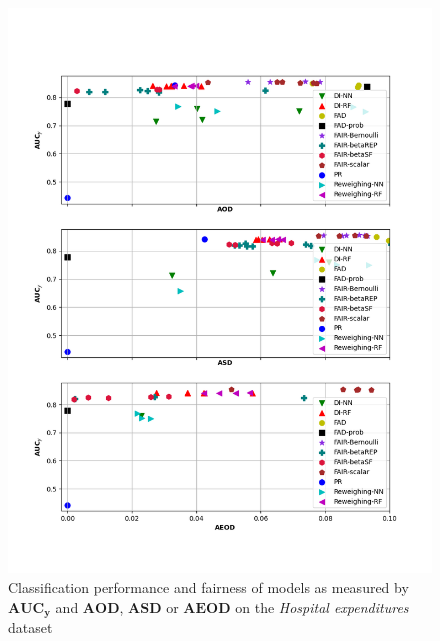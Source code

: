 \documentclass[preprint,12pt]{elsarticle}
\begin{document}
\begin{figure}
	\center
	\includegraphics[angle=0, width=1\textwidth]{MEPS19_all.png}
	\captionsetup{justification=centering}
	\caption{Classification performance and fairness of models as measured by $\mathbf{AUC_y}$ and $\mathbf{AOD}$, $\mathbf{ASD}$ or $\mathbf{AEOD}$ on the \textit{Hospital expenditures} dataset}
	\label{fig:MEPS19 all}
	\vskip -0.2in
\end{figure}
\end{document}
